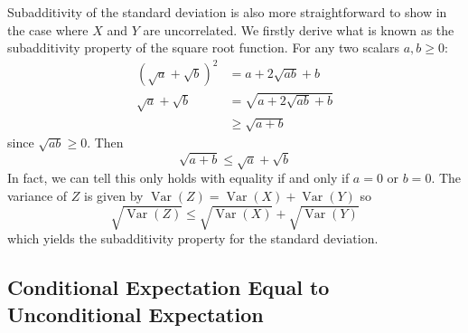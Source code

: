 \documentclass[11pt]{report} %
\begin{document}
Subadditivity of the standard deviation is also more straightforward to show in the case where $X$ and $Y$ are uncorrelated. We firstly derive what is known as the subadditivity property of the square root function. For any two scalars $a, b \geq 0$:
\begin{align}
\left(\sqrt{a} + \sqrt{b}\right)^{2} &= a + 2\sqrt{ab} + b \\
\sqrt{a} + \sqrt{b} &= \sqrt{a + 2\sqrt{ab} + b} \\
&\geq \sqrt{a + b}
\end{align}
since $\sqrt{ab} \geq 0$. Then
\begin{equation}
\sqrt{a + b} \leq \sqrt{a} + \sqrt{b}
\end{equation}
In fact, we can tell this only holds with equality if and only if $a = 0$ or $b = 0$. The variance of $Z$ is given by $\operatorname{Var}\left(Z\right) = \operatorname{Var}\left(X\right) + \operatorname{Var}\left(Y\right)$ so
\begin{equation}
\sqrt{\operatorname{Var}\left(Z\right)} \leq \sqrt{\operatorname{Var}\left(X\right)} + \sqrt{\operatorname{Var}\left(Y\right)}
\end{equation}
which yields the subadditivity property for the standard deviation.

\subsection{Conditional Expectation Equal to Unconditional Expectation}
\end{document}
